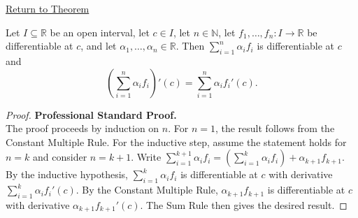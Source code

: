 \newpage
{}
\label{prf:finite-linear-combination}

\begin{remark*}[Return]
\hyperref[thm:finite-linear-combination-rule]{Return to Theorem}
\end{remark*}

\begin{theorem*}
Let $I \subseteq \mathbb{R}$ be an open interval, let $c \in I$, let $n \in \mathbb{N}$, let $f_1, \ldots, f_n : I \to \mathbb{R}$ be differentiable at $c$, and let $\alpha_1, \ldots, \alpha_n \in \mathbb{R}$. Then $\sum_{i=1}^{n} \alpha_i f_i$ is differentiable at $c$ and
\[
\left(\sum_{i=1}^{n} \alpha_i f_i\right)'(c) = \sum_{i=1}^{n} \alpha_i f_i'(c).
\]
\end{theorem*}

\begin{proof}
\textbf{Professional Standard Proof.}~\\
The proof proceeds by induction on $n$. For $n = 1$, the result follows from the Constant Multiple Rule. For the inductive step, assume the statement holds for $n = k$ and consider $n = k+1$. Write $\sum_{i=1}^{k+1} \alpha_i f_i = \left(\sum_{i=1}^{k} \alpha_i f_i\right) + \alpha_{k+1} f_{k+1}$. By the inductive hypothesis, $\sum_{i=1}^{k} \alpha_i f_i$ is differentiable at $c$ with derivative $\sum_{i=1}^{k} \alpha_i f_i'(c)$. By the Constant Multiple Rule, $\alpha_{k+1} f_{k+1}$ is differentiable at $c$ with derivative $\alpha_{k+1} f_{k+1}'(c)$. The Sum Rule then gives the desired result.
\end{proof}

